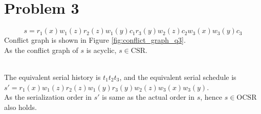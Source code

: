 \documentclass[12pt]{article}
\begin{document}
\section*{Problem 3}
\begin{equation*}
    s = r_1(x) w_1(z) r_2(z) w_1(y) c_1 r_3(y) w_2(z) c_2 w_3(x) w_3(y) c_3
\end{equation*}
Conflict graph is shown in Figure \ref{fig:conflict_graph_q3}.\\ As the conflict graph of $s$ is acyclic, $ s \in \text{CSR}$.
\begin{figure*}[h]
    \centering
    \caption{Conflict Graph}
    \label{fig:conflict_graph_q3}
\end{figure*}\\
The equivalent serial history is $t_1t_2t_3$, and the equivalent serial schedule is \\
$s' = r_1(x) w_1(z) r_2(z) w_1(y) r_3(y) w_2(z) w_3(x) w_3(y)$. \\
As the serialization order in $s'$ is same as the actual order in $s$, hence $s \in \text{OCSR}$ also holds.
\end{document}
